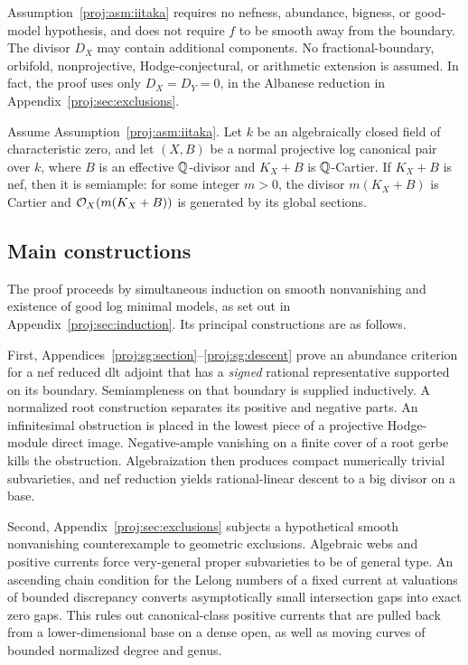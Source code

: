 Assumption~\ref{proj:asm:iitaka} requires no nefness, abundance, bigness,
or good-model hypothesis, and does not require \(f\) to be smooth
away from the boundary. The divisor \(D_X\) may contain additional
components. No fractional-boundary,
orbifold, nonprojective, Hodge-conjectural, or arithmetic extension is
assumed. In fact, the proof uses only \(D_X=D_Y=0\), in the Albanese
reduction in Appendix~\ref{proj:sec:exclusions}.

\begin{theorem}\label{proj:thm:main}\label{proj:main}\label{proj:conditional-log-abundance}
Assume Assumption~\ref{proj:asm:iitaka}. Let \(k\) be an algebraically closed
field of characteristic zero, and let \((X,B)\) be a normal projective log
canonical pair over \(k\), where \(B\) is an effective \(\mathbb{Q}\)-divisor
and \(K_X+B\) is \(\mathbb{Q}\)-Cartier. If \(K_X+B\) is nef, then it is
semiample: for some integer \(m>0\), the divisor \(m(K_X+B)\) is
Cartier and \(\mathcal{O}_X(m(K_X+B))\) is generated by its global sections.
\end{theorem}

\subsection{Main constructions}

The proof proceeds by simultaneous induction on smooth nonvanishing
and existence of good log minimal models, as set out in
Appendix~\ref{proj:sec:induction}. Its principal constructions are as follows.

First, Appendices~\ref{proj:sg:section}--\ref{proj:sg:descent} prove an abundance
criterion for a nef reduced dlt adjoint
that has a \emph{signed} rational representative supported on its
boundary. Semiampleness on that boundary is supplied inductively.
A normalized root construction separates its positive and negative
parts. An infinitesimal obstruction is placed in the lowest piece of
a projective Hodge-module direct image. Negative-ample vanishing on
a finite cover of a root gerbe kills the obstruction. Algebraization
then produces compact numerically trivial subvarieties, and nef
reduction yields rational-linear descent to a big divisor on a base.

Second, Appendix~\ref{proj:sec:exclusions} subjects a hypothetical smooth
nonvanishing counterexample to geometric exclusions. Algebraic webs and positive currents force
very-general proper subvarieties to be of general type. An ascending
chain condition for the Lelong numbers of a fixed current at valuations
of bounded discrepancy converts asymptotically small intersection gaps
into exact zero gaps. This rules out canonical-class positive currents
that are pulled back from a lower-dimensional base on a dense open,
as well as moving curves of bounded normalized degree and genus.

